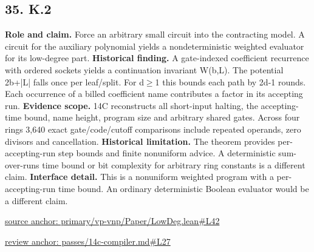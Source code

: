 \documentclass[11pt,letterpaper]{article}
\theoremstyle{definition}\newtheorem{definition}[theorem]{Definition}\newtheorem{example}[theorem]{Example}
\theoremstyle{remark}\newtheorem{remark}[theorem]{Remark}
\begin{document}
\subsection*{35. K.2}
\textbf{Role and claim.} Force an arbitrary small circuit into the contracting model. A circuit for the auxiliary polynomial yields a nondeterministic weighted evaluator for its low-degree part.
\textbf{Historical finding.} A gate-indexed coefficient recurrence with ordered sockets yields a continuation invariant W(b,L). The potential 2b+|L| falls once per leaf/split. For d\ensuremath{\ge}1 this bounds each path by 2d-1 rounds. Each occurrence of a billed coefficient name contributes a factor in its accepting run.
\textbf{Evidence scope.} 14C reconstructs all short-input halting, the accepting-time bound, name height, program size and arbitrary shared gates. Across four rings 3,640 exact gate/code/cutoff comparisons include repeated operands, zero divisors and cancellation.
\textbf{Historical limitation.} The theorem provides per-accepting-run step bounds and finite nonuniform advice. A deterministic sum-over-runs time bound or bit complexity for arbitrary ring constants is a different claim.
\textbf{Interface detail.} This is a nonuniform weighted program with a per-accepting-run time bound. An ordinary deterministic Boolean evaluator would be a different claim.
\par\href{https://github.com/nousentllc/VP-VNP-Review/blob/8a7976933b6b2b4ffda1ad3a0dfb5fc6b6f023e8/primary/vp-vnp/Paper/LowDeg.lean\#L42}{source anchor: primary/vp-vnp/Paper/LowDeg.lean\#L42}
\par\href{https://github.com/nousentllc/VP-VNP-Review/blob/8a7976933b6b2b4ffda1ad3a0dfb5fc6b6f023e8/passes/14c-compiler.md\#L27}{review anchor: passes/14c-compiler.md\#L27}
\goodbreak
{}
\hypertarget{claim.36}{}
\end{document}
